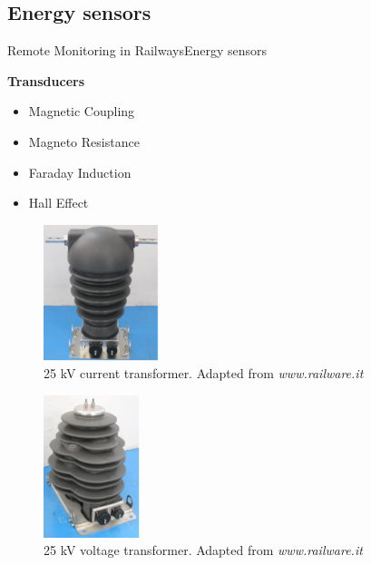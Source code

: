 \subsection{Energy sensors}

\begin{frame}{Remote Monitoring in Railways}{Energy sensors}
	\begin{block}{\textbf{Transducers}}
	
	\begin{minipage}[t]{0.48\linewidth}
		\vspace{5em}
	\begin{itemize}
		\item Magnetic Coupling
		\item Magneto Resistance
		\item Faraday Induction
		\item Hall Effect
	\end{itemize}
	\end{minipage}\hfill
	\begin{minipage}[t]{0.48\linewidth}
		
		
		\begin{figure}[ht!]
			\centering
			\includegraphics[width=0.30\textwidth,keepaspectratio]{figures/32.EnergyS/current_t}
			\caption{25 kV current transformer. Adapted from \textit{www.railware.it}}
		\end{figure}
		
			\begin{figure}[ht!]
			\centering
			\vspace{-3em}
			\includegraphics[width=0.25\textwidth,keepaspectratio]{figures/32.EnergyS/voltage_t}
			\caption{25 kV voltage transformer. Adapted from \textit{www.railware.it}}
		\end{figure}
		
		
	\end{minipage}
	

		
	\end{block}
\end{frame}
